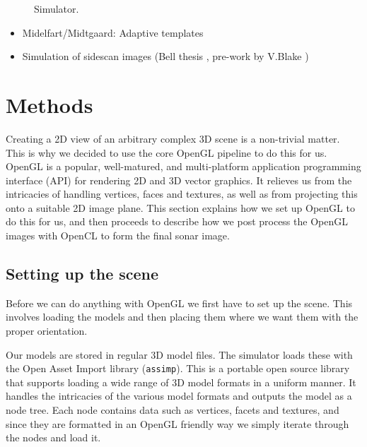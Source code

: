 \documentclass[
   UAM                                          %
 , 12pt                                         %
 , bibtex                                       %
 , layout
]{common/mytemplate}
\begin{document}
\begin{figure}[t]\centering%
%
\caption{Simulator.}\label{buildup}%
\end{figure}

\begin{itemize}
\item Midelfart/Midtgaard: Adaptive templates \cite{Midelfart2010}
\item Simulation of sidescan images (Bell thesis \cite{Bell1997}, pre-work by V.Blake \cite{Blake1993})
\end{itemize}
 

\section{Methods}

Creating a 2D view of an arbitrary complex 3D scene is a non-trivial matter. This is why we decided to use the core OpenGL pipeline to do this for us. OpenGL is a popular, well-matured, and multi-platform application programming interface (API) for rendering 2D and 3D vector graphics. It relieves us from the intricacies of handling vertices, faces and textures, as well as from projecting this onto a suitable 2D image plane. This section explains how we set up OpenGL to do this for us, and then proceeds to describe how we post process the OpenGL images with OpenCL to form the final sonar image.


\subsection{Setting up the scene}

Before we can do anything with OpenGL we first have to set up the scene. This involves loading the models and then placing them where we want them with the proper orientation. 

Our models are stored in regular 3D model files. The simulator loads these with the Open Asset Import library (\texttt{assimp}). This is a portable open source library that supports loading a wide range of 3D model formats in a uniform manner. It handles the intricacies of the various model formats and outputs the model as a node tree. Each node contains data such as vertices, facets and textures, and since they are formatted in an OpenGL friendly way we simply iterate through the nodes and load it.
\end{document}
